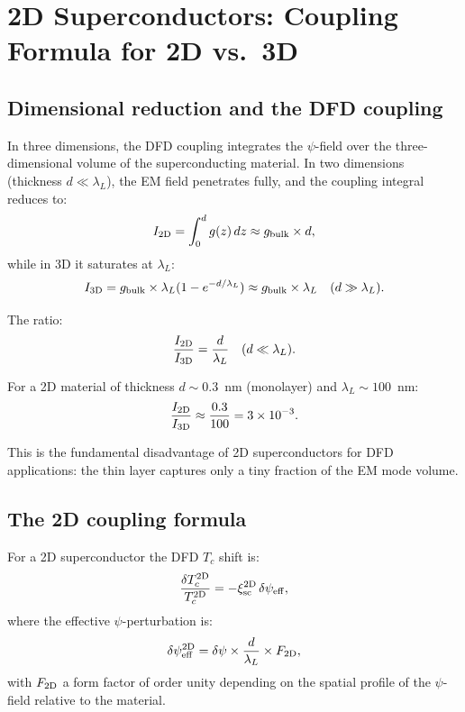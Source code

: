 \documentclass[11pt]{article}
\newcommand{\ee}[1]{\times 10^{#1}}
\begin{document}
\section{2D Superconductors: Coupling Formula for 2D vs.\ 3D}
\label{sec:2D}

\subsection{Dimensional reduction and the DFD coupling}

In three dimensions, the DFD coupling integrates the $\psi$-field over
the three-dimensional volume of the superconducting material. In two
dimensions (thickness $d \ll \lambda_L$), the EM field penetrates
fully, and the coupling integral reduces to:
\begin{equation}
I_{\rm 2D} = \int_0^d g(z)\,dz \approx g_{\rm bulk} \times d,
\label{eq:I-2D}
\end{equation}
while in 3D it saturates at $\lambda_L$:
\begin{equation}
I_{\rm 3D} = g_{\rm bulk} \times \lambda_L(1 - e^{-d/\lambda_L})
\approx g_{\rm bulk} \times \lambda_L \quad(d \gg \lambda_L).
\label{eq:I-3D}
\end{equation}

The ratio:
\begin{equation}
\frac{I_{\rm 2D}}{I_{\rm 3D}} = \frac{d}{\lambda_L}
\quad(d \ll \lambda_L).
\label{eq:I-2D-3D-ratio}
\end{equation}

For a 2D material of thickness $d \sim 0.3$~nm (monolayer) and
$\lambda_L \sim 100$~nm:
\begin{equation}
\frac{I_{\rm 2D}}{I_{\rm 3D}} \approx \frac{0.3}{100} = 3\ee{-3}.
\label{eq:I-2D-monolayer}
\end{equation}

This is the fundamental disadvantage of 2D superconductors for DFD
applications: the thin layer captures only a tiny fraction of the
EM mode volume.

\subsection{The 2D coupling formula}

For a 2D superconductor the DFD $T_c$ shift is:
\begin{equation}
\frac{\delta T_c^{\rm 2D}}{T_c^{\rm 2D}}
= -\xi_{\rm sc}^{\rm 2D}\,\delta\psi_{\rm eff},
\label{eq:Tc-2D}
\end{equation}
where the effective $\psi$-perturbation is:
\begin{equation}
\delta\psi_{\rm eff}^{\rm 2D} = \delta\psi \times \frac{d}{\lambda_L}
\times F_{\rm 2D},
\label{eq:psi-eff-2D}
\end{equation}
with $F_{\rm 2D}$ a form factor of order unity depending on the
spatial profile of the $\psi$-field relative to the material.
\end{document}
